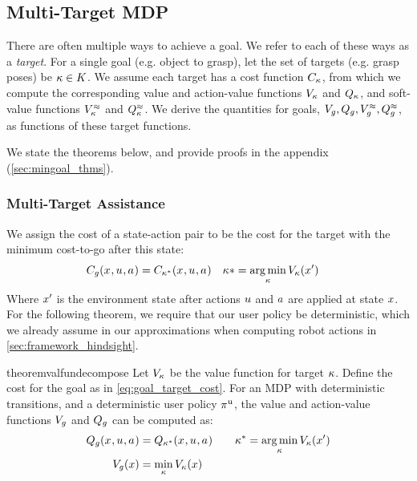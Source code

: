 \subsection{Multi-Target MDP}
\label{sec:framework_multitarget}

There are often multiple ways to achieve a goal. We refer to each of these ways as a \emph{target}. For a single goal (e.g. object to grasp), let the set of targets (e.g. grasp poses) be $\kappa \in K$. We assume each target has a cost function $C_{\kappa}$, from which we compute the corresponding value and action-value functions $V_{\kappa}$ and $Q_{\kappa}$, and soft-value functions $V^{\approx}_{\kappa}$ and $Q^{\approx}_{\kappa}$. We derive the quantities for goals, $V_{g}, Q_{g}, V^{\approx}_g, Q^{\approx}_g$, as functions of these target functions.

We state the theorems below, and provide proofs in the appendix (\cref{sec:mingoal_thms}).

\subsubsection{Multi-Target Assistance}
\label{sec:framework_multigarget_assistance}
We assign the cost of a state-action pair to be the cost for the target with the minimum cost-to-go after this state:
\begin{align}
  C_g(x_{ }, u_{ }, a_{ }) &= C_{\kappa^*}(x_{ }, u_{ }, a_{ }) \quad \kappa* = \operatorname*{arg\,min}_\kappa V_{\kappa}(x') \label{eq:goal_target_cost}
\end{align}
Where $x'$ is the environment state after actions $u$ and $a$ are applied at state $x$. For the following theorem, we require that our user policy be deterministic, which we already assume in our approximations when computing robot actions in \cref{sec:framework_hindsight}.
\begin{restatable}{theorem}{valfundecompose}
\label{thm:mingoal_assist}
Let $V_{\kappa}$ be the value function for target $\kappa$. Define the cost for the goal as in \cref{eq:goal_target_cost}. For an MDP with deterministic transitions, and a deterministic user policy $\pi^{\text{u}}$, the value and action-value functions $V_{g}$ and $Q_{g}$ can be computed as:
\begin{align*}
  Q_{g}(x_{ }, u_{ }, a_{ }) &= Q_{\kappa^*}(x_{ }, u_{ }, a_{ }) \qquad \kappa^* = \operatorname*{arg\,min}_\kappa V_{\kappa}(x') \\
  V_{g}(x) &= \min_\kappa V_{\kappa}(x)
\end{align*}
\end{restatable}

